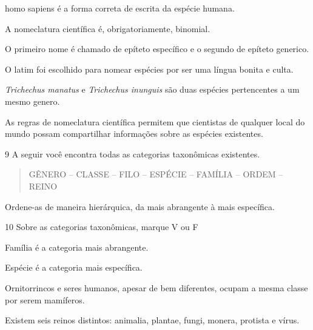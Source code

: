 \begin{boxlist}
\item homo sapiens é a forma correta de escrita da espécie humana. 

\item A nomeclatura científica é, obrigatoriamente, binomial. 

\item O primeiro nome é chamado de epíteto específico e o segundo de
epíteto generico. 

\item O latim foi escolhido para nomear espécies por ser uma língua bonita
e culta. 

\item \emph{Trichechus manatus} e \emph{Trichechus inunguis} são duas
espécies pertencentes a um mesmo genero. 

\item As regras de nomeclatura científica permitem que cientistas de
qualquer local do mundo possam compartilhar informações sobre as
espécies existentes. 
\end{boxlist}

\num{9}  A seguir você encontra todas as categorias taxonômicas existentes.

\begin{quote}
GÊNERO -- CLASSE -- FILO -- ESPÉCIE -- FAMÍLIA -- ORDEM -- REINO
\end{quote}

Ordene-as de maneira hierárquica, da mais abrangente à mais específica.



\num{10}  Sobre as categorias taxonômicas, marque V ou F

\begin{boxlist}
\item Família é a categoria mais abrangente. 

\item Espécie é a categoria mais específica. 

\item Ornitorrincos e seres humanos, apesar de bem diferentes, ocupam a
mesma classe por serem mamíferos. 

\item Existem seis reinos distintos: animalia, plantae, fungi, monera,
protista e vírus. 
\end{boxlist}


